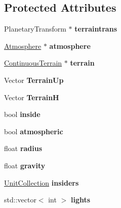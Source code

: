 \subsection*{Protected Attributes}
\begin{DoxyCompactItemize}
\item 
Planetary\+Transform $\ast$ {\bfseries terraintrans}\hypertarget{classPlanet_a637e6eefce881cf8a7fd6861589b2348}{}\label{classPlanet_a637e6eefce881cf8a7fd6861589b2348}

\item 
\hyperlink{classAtmosphere}{Atmosphere} $\ast$ {\bfseries atmosphere}\hypertarget{classPlanet_a58e55b7259ff94260db13a95352ed5e4}{}\label{classPlanet_a58e55b7259ff94260db13a95352ed5e4}

\item 
\hyperlink{classContinuousTerrain}{Continuous\+Terrain} $\ast$ {\bfseries terrain}\hypertarget{classPlanet_a4f6139335c03921e91d789f9c92f8197}{}\label{classPlanet_a4f6139335c03921e91d789f9c92f8197}

\item 
Vector {\bfseries Terrain\+Up}\hypertarget{classPlanet_a4d81fc675264c6ec118341d7462ec7cf}{}\label{classPlanet_a4d81fc675264c6ec118341d7462ec7cf}

\item 
Vector {\bfseries TerrainH}\hypertarget{classPlanet_a78aca819ed243fddf3c7d6a2d1a928d1}{}\label{classPlanet_a78aca819ed243fddf3c7d6a2d1a928d1}

\item 
bool {\bfseries inside}\hypertarget{classPlanet_a23709318731ea6298971b5058cd1bd06}{}\label{classPlanet_a23709318731ea6298971b5058cd1bd06}

\item 
bool {\bfseries atmospheric}\hypertarget{classPlanet_adadf2c2022fc64b4ccd47071eaabd625}{}\label{classPlanet_adadf2c2022fc64b4ccd47071eaabd625}

\item 
float {\bfseries radius}\hypertarget{classPlanet_a8315cb11c044d85ae41759c4aae832ce}{}\label{classPlanet_a8315cb11c044d85ae41759c4aae832ce}

\item 
float {\bfseries gravity}\hypertarget{classPlanet_a7294bcc0776f58608155a994b0a1412c}{}\label{classPlanet_a7294bcc0776f58608155a994b0a1412c}

\item 
\hyperlink{classUnitCollection}{Unit\+Collection} {\bfseries insiders}\hypertarget{classPlanet_a71bd416e7e988141ebb6a276b19ef7b1}{}\label{classPlanet_a71bd416e7e988141ebb6a276b19ef7b1}

\item 
std\+::vector$<$ int $>$ {\bfseries lights}\hypertarget{classPlanet_a65e0d7070265fe86913d445cb7a450b9}{}\label{classPlanet_a65e0d7070265fe86913d445cb7a450b9}

\end{DoxyCompactItemize}
